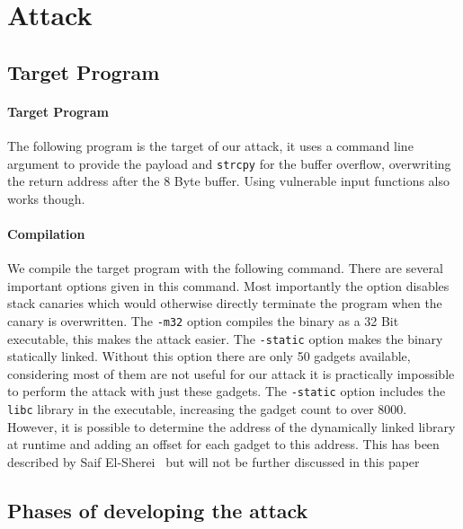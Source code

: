 \documentclass[journal=tosc,submission, notanonymous]{iacrtrans}
\begin{document}
\section{Attack}
\label{sec:attack}
\subsection{Target Program}
\paragraph{Target Program}
The following program is the target of our attack, it uses a command line argument to provide the payload and \Verb+strcpy+ for the buffer overflow, overwriting the return address after the 8 Byte buffer. Using vulnerable input functions also works though.
\paragraph{Compilation}
We compile the target program with the following command. There are several important options given in this command. Most importantly the  option disables stack canaries which would otherwise directly terminate the program when the canary is overwritten. The \Verb+-m32+ option compiles the binary as a 32 Bit executable, this makes the attack easier. The \Verb+-static+ option makes the binary statically linked. Without this option there are only 50 gadgets available, considering most of them are not useful for our attack it is practically impossible to perform the attack with just these gadgets. The \Verb+-static+ option includes the \Verb+libc+ library in the executable, increasing the gadget count to over 8000. However, it is possible to determine the address of the dynamically linked library at runtime and adding an offset for each gadget to this address. This has been described by Saif El-Sherei~\cite{el-sherei} but will not be further discussed in this paper
\subsection{Phases of developing the attack}
\end{document}
